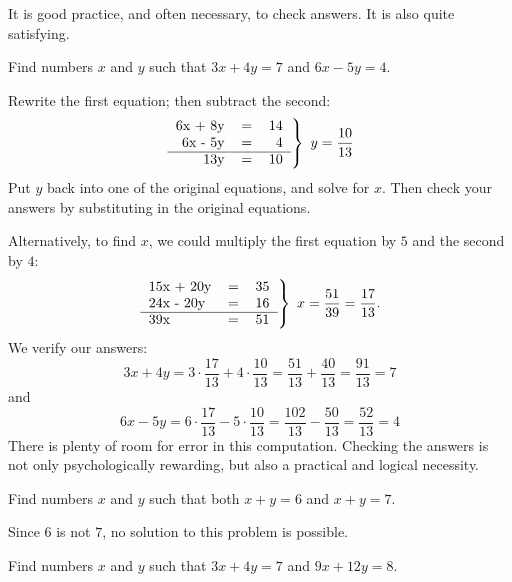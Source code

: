 \documentclass{article}
\begin{document}
\begin{description}
    It is good practice, and often necessary, to check answers. It is also quite satisfying.

  \item[Sample Problem 5:] Find numbers $x$ and $y$ such that $3x + 4y = 7$ and $6x - 5y = 4$.

    Rewrite the first equation; then subtract the second: 
    \begin{equation*}
    \left.
    \begin{tabular}{rrr}
      6x + 8y & = & 14 \\
      6x - 5y & = &  4 \\
      \cline{1-3}
      13y & = & 10
    \end{tabular} 
    \right\}
    \ y = \frac{10}{13}
    \end{equation*}
    Put $y$ back into one of the original equations, and solve for $x$. Then check your answers by substituting in the original equations.

    Alternatively, to find $x$, we could multiply the first equation by $5$ and the second by $4$:
    \begin{equation*}
    \left.
    \begin{tabular}{lrr}
      15x + 20y & = & 35 \\
      24x - 20y & = & 16 \\ 
      \cline{1-3}
      39x & = & 51
    \end{tabular} 
    \right\}
    \ x = \frac{51}{39} = \frac{17}{13}.
    \end{equation*}
    We verify our answers:
    \begin{equation*}
    3x + 4y = 3 \cdot \frac{17}{13} + 4 \cdot \frac{10}{13} = \frac{51}{13} + \frac{40}{13} = \frac{91}{13} = 7
    \end{equation*}
    and
    \begin{equation*}
    6x - 5y = 6 \cdot \frac{17}{13} - 5 \cdot \frac{10}{13} = \frac{102}{13} - \frac{50}{13} = \frac{52}{13} = 4
    \end{equation*}
    There is plenty of room for error in this computation. Checking the answers is not only psychologically rewarding, but also a practical and logical necessity.

  \item[Sample Problem 6:] Find numbers $x$ and $y$ such that both $x+y = 6$ and $x+y = 7$. 

    Since $6$ is not $7$, no solution to this problem is possible.

  \item[Sample Problem 7:] Find numbers $x$ and $y$ such that $3x + 4y = 7$ and $9x + 12y = 8$. 


\end{description}
\end{document}
